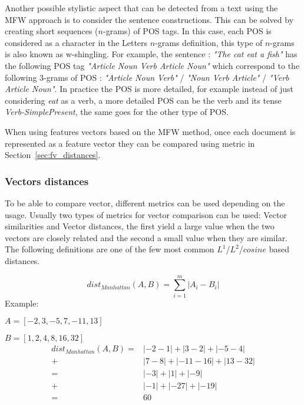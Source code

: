 Another possible stylistic aspect that can be detected from a text using the MFW approach is to consider the sentence constructions.
This can be solved by creating short sequences ($n$-grams) of POS tags.
In this case, each POS is considered as a character in the Letters $n$-grams definition, this type of $n$-grams is also known as w-shingling.
For example, the sentence : \textit{"The cat eat a fish"} has the following POS tag \textit{"Article Noun Verb Article Noun"} which correspond to the following 3-grams of POS : \textit{"Article Noun Verb"} / \textit{"Noun Verb Article"} / \textit{"Verb Article Noun"}.
In practice the POS is more detailed, for example instead of just considering \textit{eat} as a verb, a more detailed POS can be the verb and its tense \textit{Verb-SimplePresent}, the same goes for the other type of POS.

When using features vectors based on the MFW method, once each document is represented as a feature vector they can be compared using metric in Section~\ref{sec:fv_distances}.

\subsubsection{Vectors distances \label{sec:fv_distances}}

To be able to compare vector, different metrics can be used depending on the usage.
Usually two types of metrics for vector comparison can be used: Vector similarities and Vector distances, the first yield a large value when the two vectors are closely related and the second a small value when they are similar.
The following definitions are one of the few most common $L^1$/$L^2$/$cosine$ based distances.

\begin{definition}
  \begin{equation}
    dist_{Manhattan}(A, B) = \sum_{i=1}^{m} |A_i - B_i|
  \end{equation}
  Example:

  $A = \left[-2, 3, -5, 7, -11, 13 \right]$

  $B = \left[1, 2, 4, 8, 16, 32 \right]$
  \begin{equation*}
    \begin{aligned}
      dist_{Manhattan}(A, B) =& |-2 - 1| + |3 - 2| + |-5 - 4| \\
                             +& |7 - 8| + |-11 - 16| + |13 - 32| \\
                             =& |-3| + |1| + |-9| \\
                             +& |-1| + |-27| + |-19| \\
                             =& 60
    \end{aligned}
  \end{equation*}
\end{definition}

